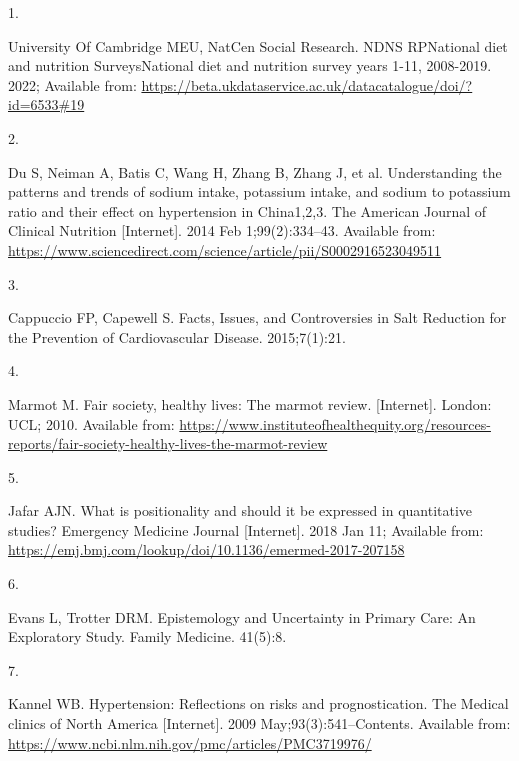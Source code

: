 \documentclass[
]{article}
\newlength{\cslhangindent}
\newlength{\csllabelwidth}
\newlength{\cslentryspacingunit} %
\newenvironment{CSLReferences}[2] %
 {%
  \setlength{\parindent}{0pt}
  \ifodd #1
  \let\oldpar\par
  \def\par{\hangindent=\cslhangindent\oldpar}
  \fi
  \setlength{\parskip}{#2\cslentryspacingunit}
 }%
 {}
\newcommand{\CSLLeftMargin}[1]{\parbox[t]{\csllabelwidth}{#1}}
\newcommand{\CSLRightInline}[1]{\parbox[t]{\linewidth - \csllabelwidth}{#1}\break}
\begin{document}
\hypertarget{refs}{}
\begin{CSLReferences}{0}{0}
\leavevmode{}%
\CSLLeftMargin{1. }%
\CSLRightInline{University Of Cambridge MEU, NatCen Social Research.
NDNS RPNational diet and nutrition SurveysNational diet and nutrition
survey years 1-11, 2008-2019. 2022; Available from:
\url{https://beta.ukdataservice.ac.uk/datacatalogue/doi/?id=6533\#19}}

\leavevmode{}%
\CSLLeftMargin{2. }%
\CSLRightInline{Du S, Neiman A, Batis C, Wang H, Zhang B, Zhang J, et
al. Understanding the patterns and trends of sodium intake, potassium
intake, and sodium to potassium ratio and their effect on hypertension
in China1,2,3. The American Journal of Clinical Nutrition
{[}Internet{]}. 2014 Feb 1;99(2):334--43. Available from:
\url{https://www.sciencedirect.com/science/article/pii/S0002916523049511}}

\leavevmode{}%
\CSLLeftMargin{3. }%
\CSLRightInline{Cappuccio FP, Capewell S. Facts, Issues, and
Controversies in Salt Reduction for the Prevention of Cardiovascular
Disease. 2015;7(1):21. }

\leavevmode{}%
\CSLLeftMargin{4. }%
\CSLRightInline{Marmot M. Fair society, healthy lives: The marmot
review. {[}Internet{]}. London: UCL; 2010. Available from:
\url{https://www.instituteofhealthequity.org/resources-reports/fair-society-healthy-lives-the-marmot-review}}

\leavevmode{}%
\CSLLeftMargin{5. }%
\CSLRightInline{Jafar AJN. What is positionality and should it be
expressed in quantitative studies? Emergency Medicine Journal
{[}Internet{]}. 2018 Jan 11; Available from:
\url{https://emj.bmj.com/lookup/doi/10.1136/emermed-2017-207158}}

\leavevmode{}%
\CSLLeftMargin{6. }%
\CSLRightInline{Evans L, Trotter DRM. Epistemology and Uncertainty in
Primary Care: An Exploratory Study. Family Medicine. 41(5):8. }

\leavevmode{}%
\CSLLeftMargin{7. }%
\CSLRightInline{Kannel WB. Hypertension: Reflections on risks and
prognostication. The Medical clinics of North America {[}Internet{]}.
2009 May;93(3):541--Contents. Available from:
\url{https://www.ncbi.nlm.nih.gov/pmc/articles/PMC3719976/}}


\end{CSLReferences}
\end{document}
